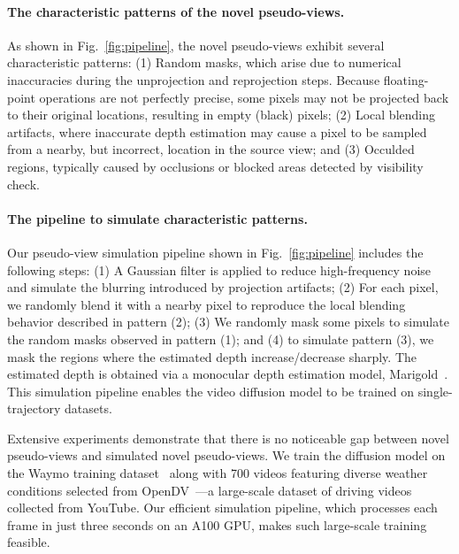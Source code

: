 \paragraph{The characteristic patterns of the novel pseudo-views. } As shown in Fig.~\ref{fig:pipeline}, the novel pseudo-views exhibit several characteristic patterns: (1) Random masks, which arise due to numerical inaccuracies during the unprojection and reprojection steps. Because floating-point operations are not perfectly precise, some pixels may not be projected back to their original locations, resulting in empty (black) pixels; (2) Local blending artifacts, where inaccurate depth estimation may cause a pixel to be sampled from a nearby, but incorrect, location in the source view; and (3) Occulded regions, typically caused by occlusions or blocked areas detected by visibility check. 

\paragraph{The pipeline to simulate characteristic patterns. }  Our pseudo-view simulation pipeline shown in Fig.~\ref{fig:pipeline} includes the following steps: (1) A Gaussian filter is applied to reduce high-frequency noise and simulate the blurring introduced by projection artifacts; (2) For each pixel, we randomly blend it with a nearby pixel to reproduce the local blending behavior described in pattern (2); (3) We randomly mask some pixels to simulate the random masks observed in pattern (1); and (4) to simulate pattern (3), we mask the regions where the estimated depth increase/decrease sharply. The estimated depth is obtained via a monocular depth estimation model, Marigold~\cite{ke2025marigold}. This simulation pipeline enables the video diffusion model to be trained on single-trajectory datasets.

Extensive experiments demonstrate that there is no noticeable gap between novel pseudo-views and simulated novel pseudo-views. We train the diffusion model on the Waymo training dataset~\cite{Sun_2020_CVPR} along with 700 videos featuring diverse weather conditions selected from OpenDV~\cite{gao2024vista}—a large-scale dataset of driving videos collected from YouTube. Our efficient simulation pipeline, which processes each frame in just three seconds on an A100 GPU, makes such large-scale training feasible.

 


